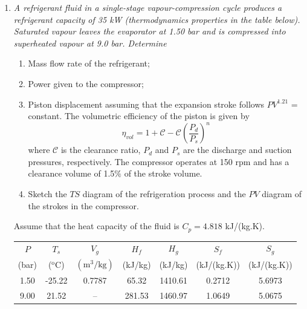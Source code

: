 \begin{enumerate}
\item \label{Ex11} {\it A refrigerant fluid in a single-stage vapour-compression cycle produces a refrigerant capacity of 35 kW (thermodynamics properties in the table below). Saturated vapour leaves the evaporator at 1.50 bar and is compressed into superheated vapour at 9.0 bar. Determine
\begin{enumerate}
\item Mass flow rate of the refrigerant;
\item Power given to the compressor;
\item Piston displacement assuming that the expansion stroke follows $PV^{1.21}$ = constant. The volumetric efficiency of the piston is given by
\begin{displaymath}
\eta_{vol}=1 + \mathcal{C} - \mathcal{C} \left(\frac{P_{d}}{P_{s}}\right)^{n}
\end{displaymath}
where $\mathcal{C}$ is the clearance ratio, $P_{d}$ and $P_{s}$ are the discharge and suction pressures, respectively. The compressor operates at 150 rpm and has a clearance volume of 1.5$\%$ of the stroke volume.
\item Sketch the $TS$ diagram of the refrigeration process and the $PV$ diagram of the strokes in the compressor.
\end{enumerate}
Assume that the heat capacity of the fluid is $C_{p}=4.818$ kJ/(kg.K).
\begin{center}
\begin{tabular}{|c c| c c c c c | }
\hline
$P$             & $T_{s}$  & $V_{g}$  & $H_{f}$  & $H_{g}$   &  $S_{f}$   &  $S_{g}$    \\
(bar)   &  ($^{\text{o}}$C)  & $\left(\text{m}^{3}/\text{kg}\right)$ & (kJ/kg) & (kJ/kg) & (kJ/(kg.K)) &  (kJ/(kg.K))  \\
\hline
1.50  &  -25.22  & 0.7787 & 65.32 & 1410.61 & 0.2712 & 5.6973  \\
9.00  &   21.52  & --     & 281.53 & 1460.97 & 1.0649 & 5.0675  \\
\hline
\end{tabular}
\end{center}
}


\end{enumerate}
